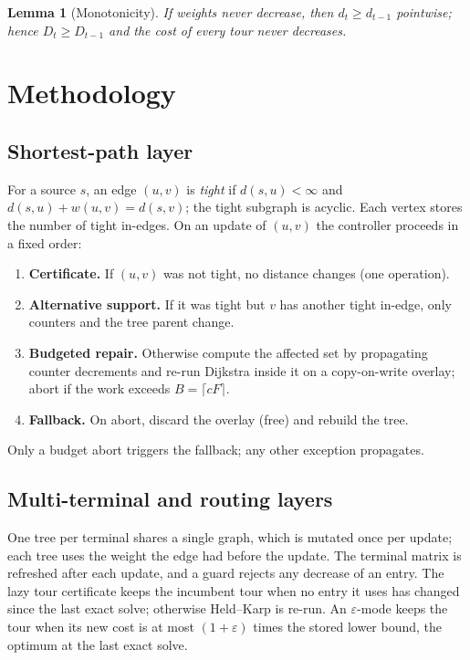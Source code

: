 \documentclass[conference]{IEEEtran}
\newtheorem{lemma}{Lemma}
\begin{document}
\begin{lemma}[Monotonicity]\label{lem:mono}
If weights never decrease, then $d_t\ge d_{t-1}$ pointwise; hence $D_t\ge D_{t-1}$ and the cost of every tour never decreases.
\end{lemma}

\section{Methodology}
\subsection{Shortest-path layer}
For a source $s$, an edge $(u,v)$ is \emph{tight} if $d(s,u)<\infty$ and $d(s,u)+w(u,v)=d(s,v)$; the tight subgraph is acyclic. Each vertex stores the number of tight in-edges.
On an update of $(u,v)$ the controller proceeds in a fixed order:
\begin{enumerate}
\item \textbf{Certificate.} If $(u,v)$ was not tight, no distance changes (one operation).
\item \textbf{Alternative support.} If it was tight but $v$ has another tight in-edge, only counters and the tree parent change.
\item \textbf{Budgeted repair.} Otherwise compute the affected set by propagating counter decrements and re-run Dijkstra inside it on a copy-on-write overlay; abort if the work exceeds $B=\lceil cF\rceil$.
\item \textbf{Fallback.} On abort, discard the overlay (free) and rebuild the tree.
\end{enumerate}
Only a budget abort triggers the fallback; any other exception propagates.

\subsection{Multi-terminal and routing layers}
One tree per terminal shares a single graph, which is mutated once per update; each tree uses the weight the edge had before the update.
The terminal matrix is refreshed after each update, and a guard rejects any decrease of an entry.
The lazy tour certificate keeps the incumbent tour when no entry it uses has changed since the last exact solve; otherwise Held--Karp is re-run.
An $\varepsilon$-mode keeps the tour when its new cost is at most $(1+\varepsilon)$ times the stored lower bound, the optimum at the last exact solve.
\end{document}
